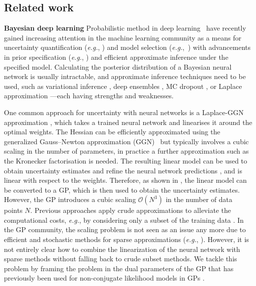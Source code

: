 \documentclass{article}
\makeatletter
\newcommand{\eg}{\textit{e.g.\@}\xspace}
\makeatother
\begin{document}
\subsection{Related work}
\label{sec:related}
%
\textbf{Bayesian deep learning}
Probabilistic method in deep learning~\cite{Wilson:ensembles,neal1995bayesian} have recently gained increasing attention in the machine learning community as a means for uncertainty quantification (\eg, \cite{kendall2017what,wilson2020bayes}) and model selection (\eg,~\cite{immer2021scalable,antoran2022marginal}) with advancements in prior specification (\eg, \cite{cho2009kernel,meronen2020stationary,meronen2021periodic,fortuin2021bayesian,nalisnick2018do}) and efficient approximate inference under the specified model.
Calculating the posterior distribution of a Bayesian neural network is usually intractable, and approximate inference techniques need to be used, such as variational inference \cite{blei2017variational}, deep ensembles \cite{lakshminarayanan2017simple}, MC dropout \cite{gal2016dropout}, or Laplace approximation \cite{ritter2018kfac,kristiadi2020being,immer2021improving}---each having strengths and weaknesses. %

One common approach for uncertainty with neural networks is a Laplace-GGN approximation \citep{daxberger2021laplace}, which takes a trained neural network and linearises it around the optimal weights. The Hessian can be efficiently approximated using the generalized Gauss--Newton approximation (GGN)~\cite{botev2017practical} but typically involves a cubic scaling in the number of parameters, in practice a further approximation such as the Kronecker factorisation \cite{martens2015optimizing,ritter2018kfac} is needed. The resulting linear model can be used to obtain uncertainty estimates and refine the neural network predictions \citep{immer2021scalable}, and is linear with respect to the weights. Therefore, as shown in \cite{immer2021scalable, khan2019approximate,maddox2021fast}, the linear model can be converted to a GP, which is then used to obtain the uncertainty estimates. 
%
However, the GP introduces a cubic scaling $\mathcal{O}(N^3)$ in the number of data points $N$. Previous approaches apply crude approximations to alleviate the computational costs, \eg, by considering only a subset of the training data \cite{immer2021scalable}. In the GP community, the scaling problem is not seen as an issue any more due to efficient and stochastic methods for sparse approximations (\eg, \cite{hensman2013gaussian,wang2019exact}). However, it is not entirely clear how to combine the linearization of the neural network with sparse methods \cite{titsias2009variational} without falling back to crude subset methods. We tackle this problem by framing the problem in the dual parameters \cite{csato2002sparse} of the GP that has previously been used for non-conjugate likelihood models in GPs \cite{adam2021dual}. 
\end{document}
